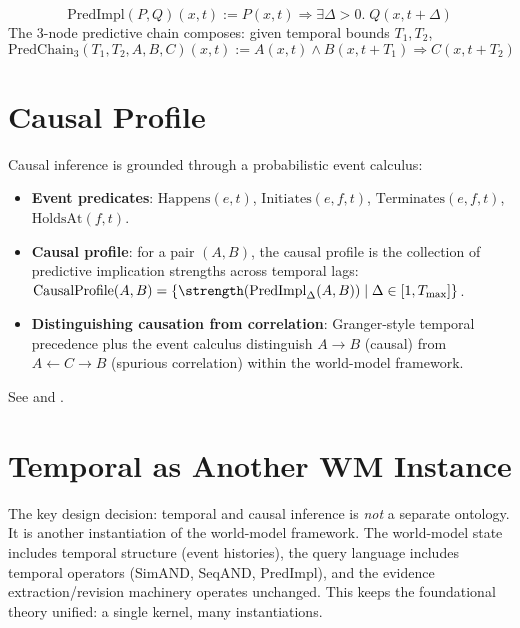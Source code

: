 \documentclass[11pt,openany]{report}
\begin{document}
\begin{definition}
\[
  \mathrm{PredImpl}(P, Q)(x, t) := P(x, t) \Rightarrow \exists \Delta > 0.\; Q(x, t + \Delta)
\]
The 3-node predictive chain composes: given temporal bounds $T_1, T_2$,
\[
  \mathrm{PredChain}_3(T_1, T_2, A, B, C)(x, t) :=
  A(x, t) \wedge B(x, t + T_1) \Rightarrow C(x, t + T_2)
\]
\end{definition}

\section{Causal Profile}

Causal inference is grounded through a probabilistic event calculus:
\begin{itemize}
\item \textbf{Event predicates}: $\mathrm{Happens}(e, t)$, $\mathrm{Initiates}(e, f, t)$,
  $\mathrm{Terminates}(e, f, t)$, $\mathrm{HoldsAt}(f, t)$.
\item \textbf{Causal profile}: for a pair $(A, B)$, the causal profile is
  the collection of predictive implication strengths across temporal lags:
  $\mathrm{CausalProfile}(A, B) = \{\strength(\mathrm{PredImpl}_\Delta(A, B))
  \mid \Delta \in [1, T_{\max}]\}$.
\item \textbf{Distinguishing causation from correlation}: Granger-style
  temporal precedence plus the event calculus distinguish $A \to B$
  (causal) from $A \leftarrow C \to B$ (spurious correlation) within the
  world-model framework.
\end{itemize}

See  and
.

\section{Temporal as Another WM Instance}

The key design decision: temporal and causal inference is \emph{not} a
separate ontology.  It is another instantiation of the world-model
framework.  The world-model state includes temporal structure (event
histories), the query language includes temporal operators (SimAND,
SeqAND, PredImpl), and the evidence extraction/revision machinery
operates unchanged.  This keeps the foundational theory unified:
a single kernel, many instantiations.
\end{document}
